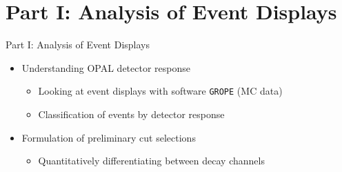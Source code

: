 \documentclass[11pt,xcolor=dvipsnames,professionalfonts]{beamer}
\begin{document}
\section{Part I: Analysis of Event Displays}
\begin{frame}{Part I: Analysis of Event Displays}
	\begin{itemize}
		\setlength\itemsep{2.em}
		\item Understanding OPAL detector response
		\begin{itemize}
			\setlength\itemsep{0.5em}
			\item Looking at event displays with software \texttt{GROPE} (MC data)
			\item Classification of events by detector response
		\end{itemize}
		
		\item Formulation of preliminary cut selections
		\begin{itemize}
			\setlength\itemsep{0.5em}
			\item Quantitatively differentiating between decay channels
		\end{itemize}
	\end{itemize}
\end{frame}
\end{document}
